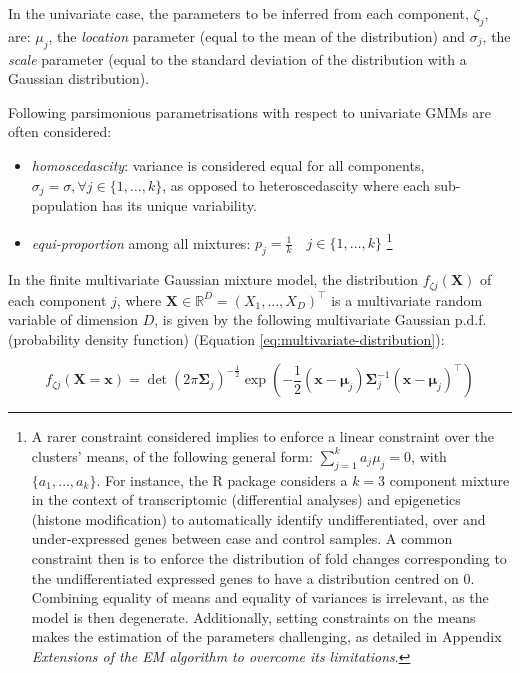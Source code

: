 In the univariate case, the parameters to be inferred from each
component, \(\zeta_j\), are: \(\mu_j\), the \emph{location} parameter (equal to
the mean of the distribution) and \(\sigma_j\), the \emph{scale} parameter
(equal to the standard deviation of the distribution with a Gaussian distribution).

Following parsimonious parametrisations with respect to univariate GMMs
are often considered:

\begin{itemize}
\item
  \emph{homoscedascity}: variance is considered equal for all components,
  \(\sigma_j = \sigma, \forall j \in \{1, \ldots, k \}\), as opposed to
  heteroscedascity where each sub-population has its unique
  variability.
\item
  \emph{equi-proportion} among all mixtures:
  \(p_j = \frac{1}{k} \quad j \in \{ 1, \ldots, k\}\) \footnote{A rarer constraint considered implies to enforce a linear
    constraint over the clusters' means, of the following general form:
    \(\sum_{j=1}^k a_j \mu_j=0\), with \(\{a_1, \ldots, a_k\}\). For
    instance, the R package  considers a \(k=3\) component
    mixture in the context of transcriptomic (differential analyses) and
    epigenetics (histone modification) to automatically identify
    undifferentiated, over and under-expressed genes between case and
    control samples. A common constraint then is to enforce the
    distribution of fold changes corresponding to the undifferentiated
    expressed genes to have a distribution centred on 0. Combining
    equality of means and equality of variances is irrelevant, as the
    model is then degenerate. Additionally, setting constraints on the
    means makes the estimation of the parameters challenging, as
    detailed in Appendix \emph{Extensions of the EM algorithm to overcome its limitations}.}
\end{itemize}

In the finite multivariate Gaussian mixture model, the distribution \(f_{\zeta j}(\boldsymbol{X})\) of each component \(j\), where
\(\boldsymbol{X} \in \mathbb{R}^D =(X_1, \ldots, X_D)^\top\) is a multivariate random variable
of dimension \(D\), is given by the
following multivariate Gaussian p.d.f. (probability density function)
(Equation \eqref{eq:multivariate-distribution}):

\begin{equation}
    f_{\zeta j}(\boldsymbol{X}=\boldsymbol{x})=\operatorname{det}(2\pi\boldsymbol{\Sigma}_j)^{-\frac{1}{2}} \exp\left( -\frac{1}{2} (\boldsymbol{x} - \boldsymbol{\mu}_j) \boldsymbol{\Sigma}_j^{-1} (\boldsymbol{x} - \boldsymbol{\mu}_j)^\top\right)
\label{eq:multivariate-distribution}
\end{equation}

